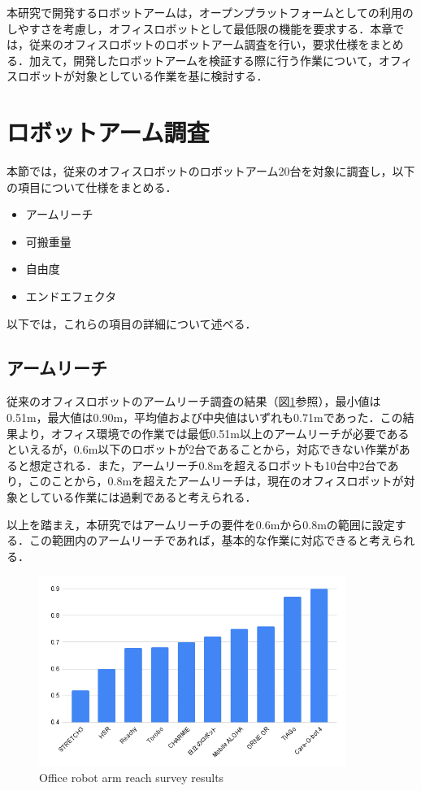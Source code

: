 本研究で開発するロボットアームは，オープンプラットフォームとしての利用のしやすさを考慮し，オフィスロボットとして最低限の機能を要求する．本章では，従来のオフィスロボットのロボットアーム調査を行い，要求仕様をまとめる．加えて，開発したロボットアームを検証する際に行う作業について，オフィスロボットが対象としている作業を基に検討する．
\section{ロボットアーム調査}
本節では，従来のオフィスロボットのロボットアーム20台を対象に調査し，以下の項目について仕様をまとめる．
\begin{itemize}
  \item アームリーチ
  \item 可搬重量
  \item 自由度
  \item エンドエフェクタ
\end{itemize}
以下では，これらの項目の詳細について述べる．

\subsection{アームリーチ}
従来のオフィスロボットのアームリーチ調査の結果（図\ref{fig:reach}参照），最小値は0.51m，最大値は0.90m，平均値および中央値はいずれも0.71mであった．この結果より，オフィス環境での作業では最低0.51m以上のアームリーチが必要であるといえるが，0.6m以下のロボットが2台であることから，対応できない作業があると想定される．また，アームリーチ0.8mを超えるロボットも10台中2台であり，このことから，0.8mを超えたアームリーチは，現在のオフィスロボットが対象としている作業には過剰であると考えられる．

以上を踏まえ，本研究ではアームリーチの要件を0.6mから0.8mの範囲に設定する．この範囲内のアームリーチであれば，基本的な作業に対応できると考えられる．
\begin{figure}[h]
  \centering
  \includegraphics[width=10cm]{images/2syou/reach.png}
  \caption{Office robot arm reach survey results}
  \label{fig:reach}
\end{figure}

